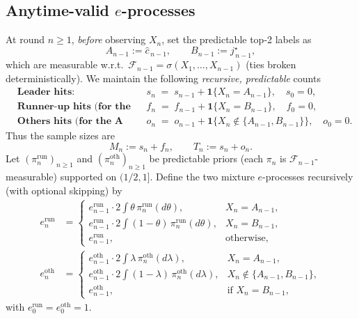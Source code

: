 \subsection{Anytime-valid $e$-processes}
\label{subsec:mmc_recursive}

At round $n\!\ge\!1$, \emph{before} observing $X_n$, set the predictable top-2 labels as
\[
A_{n-1}:=\widehat c_{\,n-1},\qquad B_{n-1}:=j^\star_{\,n-1},
\]
which are measurable w.r.t.\ $\mathcal F_{n-1}=\sigma(X_1,\dots,X_{n-1})$ (ties broken deterministically).
We maintain the following \emph{recursive, predictable} counts
\[
\begin{aligned}
&\textbf{Leader hits:}&& s_n \;=\; s_{n-1} + \mathbf 1\{X_n = A_{n-1}\}, \quad s_0=0,\\
&\textbf{Runner-up hits (for the A vs B test):}&& f_n \;=\; f_{n-1} + \mathbf 1\{X_n = B_{n-1}\}, \quad f_0=0,\\
&\textbf{Others hits (for the A vs others test):}&& o_n \;=\; o_{n-1} + \mathbf 1\{X_n \notin \{A_{n-1},B_{n-1}\}\}, \quad o_0=0.
\end{aligned}
\]
Thus the sample sizes are
\[
M_n := s_n + f_n,\qquad
T_n := s_n + o_n.
\]
Let $(\pi^{\mathrm{run}}_{n})_{n\ge1}$ and $(\pi^{\mathrm{oth}}_{n})_{n\ge1}$ be  {predictable} priors (each $\pi_n$ is $\mathcal F_{n-1}$-measurable) 
supported on $(1/2,1]$.
Define the two mixture $e$-processes recursively (with optional skipping) by
\begin{align*}
e^{\mathrm{run}}_n
&=\begin{cases}
e^{\mathrm{run}}_{n-1}\cdot 2\!\displaystyle\int \theta\,\pi^{\mathrm{run}}_n(d\theta), & X_n = A_{n-1},\\[1mm]
e^{\mathrm{run}}_{n-1}\cdot 2\!\displaystyle\int (1-\theta)\,\pi^{\mathrm{run}}_n(d\theta), & X_n = B_{n-1},\\[1mm]
e^{\mathrm{run}}_{n-1}, & \text{otherwise,}
\end{cases}\\[2mm]
e^{\mathrm{oth}}_n
&=\begin{cases}
e^{\mathrm{oth}}_{n-1}\cdot 2\!\displaystyle\int \lambda\,\pi^{\mathrm{oth}}_n(d\lambda), & X_n = A_{n-1},\\[1mm]
e^{\mathrm{oth}}_{n-1}\cdot 2\!\displaystyle\int (1-\lambda)\,\pi^{\mathrm{oth}}_n(d\lambda), & X_n \notin \{A_{n-1},B_{n-1}\},\\[1mm]
e^{\mathrm{oth}}_{n-1}, & \text{if } X_n = B_{n-1},
\end{cases}
\end{align*}
with $e^{\mathrm{run}}_0=e^{\mathrm{oth}}_0=1$.


